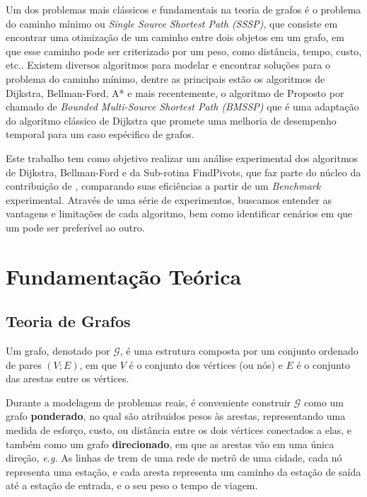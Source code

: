 \documentclass[10pt,a4paper]{article}
\begin{document}
Um dos problemas mais clássicos e fundamentais na teoria de grafos é o problema do caminho mínimo ou \textit{Single Source Shortest Path (SSSP)}, que consiste em encontrar uma otimização de um caminho entre dois objetos em um grafo, em que esse caminho pode ser criterizado por um peso, como distância, tempo, custo, etc.. Existem diversos algoritmos para modelar e encontrar soluções para o problema do caminho mínimo, dentre as principais estão os algoritmos de Dijkstra, Bellman-Ford, A* e mais recentemente, o algoritmo de Proposto por \citep{breakingTheSortingBarrier} chamado de \textit{Bounded Multi-Source Shortest Path (BMSSP)} que é uma adaptação do algoritmo clássico de Dijkstra que promete uma melhoria de desempenho temporal para um caso espécifico de grafos.

Este trabalho tem como objetivo realizar um análise experimental dos algoritmos de Dijkstra, Bellman-Ford e da Sub-rotina FindPivots, que faz parte do núcleo da contribuição de \citep{breakingTheSortingBarrier}, comparando suas eficiências a partir de um \textit{Benchmark} experimental. Através de uma série de experimentos, buscamos entender as vantagens e limitações de cada algoritmo, bem como identificar cenários em que um pode ser preferível ao outro.

\section{Fundamentação Teórica}

\subsection{Teoria de Grafos}

Um grafo, denotado por $\mathcal{G}$, é uma estrutura composta por um conjunto ordenado de pares $\left(V;E\right) $, em que $V$ é o conjunto dos vértices (ou nós) e $E$ é o conjunto das arestas entre os vértices. 

Durante a modelagem de problemas reais, é conveniente construir $\mathcal{G}$ como um grafo \textbf{ponderado}, no qual são atribuidos pesos às arestas, representando uma medida de esforço, custo, ou distância entre os dois vértices conectados a elas, e também como um grafo \textbf{direcionado}, em que as arestas vão em uma única direção, \textit{e.g.} As linhas de trem de uma rede de metrô de uma cidade, cada nó representa uma estação, e cada aresta representa um caminho da estação de saída até a estação de entrada, e o seu peso o tempo de viagem.
\end{document}
